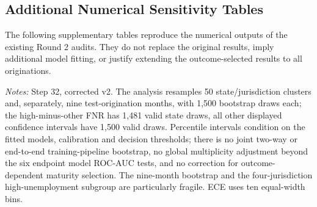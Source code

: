 \documentclass[10pt]{article}
\begin{document}
\subsection{Additional Numerical Sensitivity Tables}
\label{app:r2_numerical_supplements}

The following supplementary tables reproduce the numerical outputs of the existing Round 2 audits. They do not replace the original results, imply additional model fitting, or justify extending the outcome-selected results to all originations.

\setcounter{table}{0}
\renewcommand{\thetable}{S\arabic{table}}

\begin{table}[!ht]
\centering
\caption{Supplementary clustered test uncertainty for the previously fitted models and validation-selected 10:1 decision rule.}
\label{tab:supp_clustered}
\vspace{2pt}
{\footnotesize \textit{Notes:} Step 32, corrected v2. The analysis resamples 50 state/jurisdiction clusters and, separately, nine test-origination months, with 1,500 bootstrap draws each; the high-minus-other FNR has 1,481 valid state draws, all other displayed confidence intervals have 1,500 valid draws. Percentile intervals condition on the fitted models, calibration and decision thresholds; there is no joint two-way or end-to-end training-pipeline bootstrap, no global multiplicity adjustment beyond the six endpoint model ROC-AUC tests, and no correction for outcome-dependent maturity selection. The nine-month bootstrap and the four-jurisdiction high-unemployment subgroup are particularly fragile. ECE uses ten equal-width bins.}
\end{table}
\end{document}
